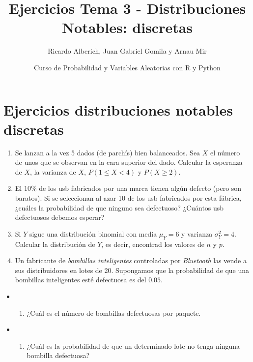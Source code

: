 \documentclass[
]{article}
\title{Ejercicios Tema 3 - Distribuciones Notables: discretas}
\author{Ricardo Alberich, Juan Gabriel Gomila y Arnau Mir}
\date{Curso de Probabilidad y Variables Aleatorias con R y Python}
\providecommand{\tightlist}{%
  \setlength{\itemsep}{0pt}\setlength{\parskip}{0pt}}
\begin{document}
\maketitle

\hypertarget{ejercicios-distribuciones-notables-discretas}{%
\section{Ejercicios distribuciones notables
discretas}\label{ejercicios-distribuciones-notables-discretas}}

\begin{enumerate}
\def\labelenumi{\arabic{enumi}.}
\item
  Se lanzan a la vez 5 dados (de parchís) bien balanceados. Sea \(X\) el
  número\\
  de unos que se observan en la cara superior del dado. Calcular la
  esperanza de \(X\), la varianza de \(X\), \(P(1\leq X<4)\) y
  \(P(X\geq 2).\)
\item
  El 10\% de los usb fabricados por una marca tienen algún defecto (pero
  son baratos). Si se seleccionan al azar 10 de los usb fabricados por
  esta fábrica, ¿cuáles la probabilidad de que ninguno sea defectuoso?
  ¿Cuántos usb defectuosos debemos esperar?
\item
  Si \(Y\) sigue una distribución binomial con media \(\mu_Y=6\) y
  varianza \(\sigma_Y^2=4\). Calcular la distribución de \(Y\), es
  decir, encontrad los valores de \(n\) y \(p\).
\item
  Un fabricante de \emph{bombillas inteligentes} controladas por
  \emph{Bluetooth} las vende a sus distribuidores en lotes de 20.
  Supongamos que la probabilidad de que una bombillas inteligentes esté
  defectuosa es del \(0.05\).
\end{enumerate}

\begin{itemize}
\item
  \begin{enumerate}
  \def\labelenumi{\alph{enumi})}
  \tightlist
  \item
    ¿Cuál es el número de bombillas defectuosas por paquete.
  \end{enumerate}
\item
  \begin{enumerate}
  \def\labelenumi{\alph{enumi})}
  \setcounter{enumi}{1}
  \tightlist
  \item
    ¿Cuál es la probabilidad de que un determinado lote no tenga ninguna
    bombilla defectuosa?
  \end{enumerate}
\end{itemize}
\end{document}
